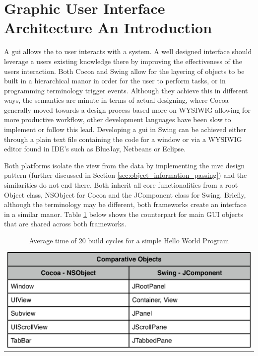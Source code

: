 \documentclass[a4paper,14pt]{article}
\begin{document}
\section{Graphic User Interface Architecture An Introduction} %
\label{sec:graphic_user_interface_architecture}
A \gls{gui} allows the to user interacts with a system. A well designed interface should leverage a users existing knowledge there by improving the effectiveness of the users interaction. Both Cocoa and Swing allow for the layering of objects to be built in a hierarchical manor in order for the user to perform tasks, or in programming terminology trigger events. Although they achieve this in different ways, the semantics are minute in terms of actual designing, where Cocoa generally moved towards a design process based more on WYSIWIG allowing for more productive workflow, other development languages have been slow to implement or follow this lead. Developing a \gls{gui} in Swing can be achieved either through a plain text file containing the code for a window or via a WYSIWIG editor found in IDE's such as BlueJay, Netbeans or Eclipse.

Both platforms isolate the view from the data by implementing the \gls{mvc} design pattern (further discussed in Section \ref{sec:object_information_passing}) and the similarities do not end there. Both inherit all core functionalities from a root Object class, NSObject for Cocoa and the JComponent class for Swing. Briefly, although the terminology may be different, both frameworks create an interface in a similar manor. Table \ref{table:tableSimilarClasses} below shows the counterpart for main GUI objects that are shared across both frameworks.


\begin{table}[here]
\centering
\begin{tabular}{l}
\includegraphics[scale=1.0]{tableSimilarClasses.eps}
\end{tabular}
\caption{Average time of 20 build cycles for a simple Hello World Program}
\label{table:tableSimilarClasses}
\end{table}
\end{document}
